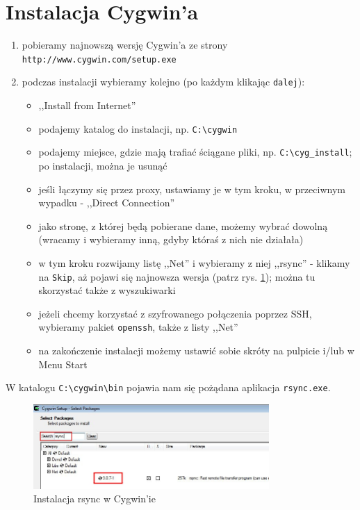 \section{Instalacja Cygwin'a}
\begin{enumerate}
\item pobieramy najnowszą wersję Cygwin'a ze strony \verb|http://www.cygwin.com/setup.exe|
\item podczas instalacji wybieramy kolejno (po każdym klikając \verb|dalej|):
  \begin{itemize}
  \item ,,Install from Internet''
  \item podajemy katalog do instalacji, np. \verb|C:\cygwin|
  \item podajemy miejsce, gdzie mają trafiać ściągane pliki, np. \verb|C:\cyg_install|; po instalacji, można je usunąć
  \item jeśli łączymy się przez proxy, ustawiamy je w tym kroku, w przeciwnym wypadku - ,,Direct Connection''
  \item jako stronę, z której będą pobierane dane, możemy wybrać dowolną (wracamy i wybieramy inną, gdyby któraś z nich nie działała)
  \item w tym kroku rozwijamy listę ,,Net'' i wybieramy z niej ,,rsync'' - klikamy na \verb|Skip|, aż pojawi się najnowsza wersja (patrz rys. \ref{cyg_inst}); można tu skorzystać także z wyszukiwarki
  \item jeżeli chcemy korzystać z szyfrowanego połączenia poprzez SSH, wybieramy pakiet \verb|openssh|, także z listy ,,Net''
  \item na zakończenie instalacji możemy ustawić sobie skróty na pulpicie i/lub w Menu Start
  \end{itemize}
\end{enumerate}
W katalogu \verb|C:\cygwin\bin| pojawia nam się pożądana aplikacja \verb|rsync.exe|.
\begin{figure}[h!]
	\centering
	\includegraphics[width=0.8\textwidth]{../img/i4.jpeg}
	\caption{Instalacja rsync w Cygwin'ie}
	\label{cyg_inst}
\end{figure}

